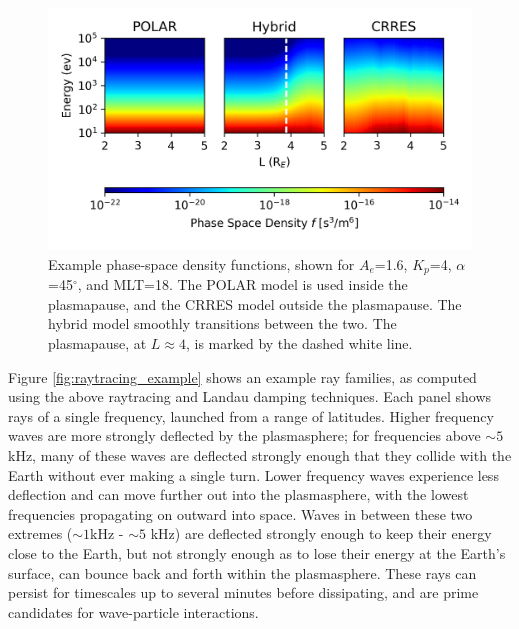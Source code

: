 \begin{figure}[ht]
\begin{center}
\includegraphics{Figures/psd.png}
\end{center}
\caption[Phase-space density functions]{Example phase-space density functions, shown for $A_e$=1.6, $K_p$=4, $\alpha$=45$^\circ$, and MLT=18. The POLAR model is used inside the plasmapause, and the CRRES model outside the plasmapause. The hybrid model smoothly transitions between the two. The plasmapause, at $L\approx 4$, is marked by the dashed white line.}
\label{fig:phase_space_density}
\end{figure}

Figure \ref{fig:raytracing_example} shows an example ray families, as computed using the above raytracing and Landau damping techniques. Each panel shows rays of a single frequency, launched from a range of latitudes. Higher frequency waves are more strongly deflected by the plasmasphere; for frequencies above $\sim 5$kHz, many of these waves are deflected strongly enough that they collide with the Earth without ever making a single turn. Lower frequency waves experience less deflection and can move further out into the plasmasphere, with the lowest frequencies propagating on outward into space. Waves in between these two extremes ($\sim 1$kHz - $\sim 5$ kHz) are deflected strongly enough to keep their energy close to the Earth, but not strongly enough as to lose their energy at the Earth's surface, can bounce back and forth within the plasmasphere. These rays can persist for timescales up to several minutes before dissipating, and are prime candidates for wave-particle interactions.



